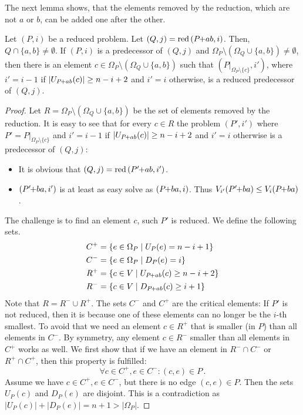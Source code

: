 \documentclass[twoside,leqno,twocolumn]{article}
\newcommand{\pchild}[3]{{#1}\kern-1pt{+}{#2}{#3}}
\newcommand{\reduced}[1]{\operatorname{red}{#1}}
\newcommand{\less}[2]{D_{#1}(#2)}
\newcommand{\greater}[2]{U_{#1}(#2)}
\begin{document}
The next lemma shows, that the elements removed by the reduction, which are not $a$ or $b$, can be added one after the other.

\begin{lemma}\label{lemma:remove_elements_iteratively}
  Let $(P, i)$ be a reduced problem.
  Let $(Q, j) = \reduced{(\pchild{P}{a}{b}, i)}$.
  Then, $Q \cap \{a, b\} \neq \emptyset$.
  If $(P, i)$ is a predecessor of $(Q, j)$ and $\Omega_P \setminus (\Omega_Q \cup \{a, b\}) \neq \emptyset$, then there is an element $c \in \Omega_P \setminus (\Omega_Q \cup \{a, b\})$ such that $(P|_{\Omega_P \setminus \{c\}}, i')$, where $i' = i - 1$ if $|\greater{\pchild{P}{a}{b}}{c}| \ge n-i+2$ and $i'=i$ otherwise, is a reduced predecessor of $(Q, j)$.
\end{lemma}

\begin{proof}
  Let $R = \Omega_P \setminus (\Omega_Q \cup \{a, b\})$ be the set of elements removed by the reduction.
  It is easy to see that for every $c \in R$ the problem $(P', i')$ where $P' = P|_{\Omega_P \setminus \{c\}}$ and $i' = i - 1$ if $|\greater{\pchild{P}{a}{b}}{c}| \ge n-i+2$ and $i'=i$ otherwise is a predecessor of $(Q, j)$:
  \begin{itemize}
    \item It is obvious that $(Q, j) = \reduced{(\pchild{P'}{a}{b}, i')}$.
    \item $(\pchild{P'}{b}{a}, i')$ is at least as easy solve as $(\pchild{P}{b}{a}, i)$. Thus $V_{i'}(\pchild{P'}{b}{a}) \le V_i(\pchild{P}{b}{a})$.
  \end{itemize}
  The challenge is to find an element $c$, such $P'$ is reduced.
  We define the following sets.
  \begin{align*}
    C^+ & = \{e \in \Omega_P \mid \greater{P}{e} = n - i + 1\}            \\
    C^- & = \{e \in \Omega_P \mid \less{P}{e} = i \}                      \\
    R^+ & = \{c \in V \mid \greater{\pchild{P}{a}{b}}{c} \ge n - i + 2 \} \\
    R^- & = \{c \in V \mid \less{\pchild{P}{a}{b}}{c} \ge i + 1 \}
  \end{align*}
  Note that $R = R^- \cup R^+$.
  The sets $C^-$ and $C^+$ are the critical elements:
  If $P'$ is not reduced, then it is because one of these elements can no longer be the $i$-th smallest.
  To avoid that we need an element $c \in R^+$ that is smaller (in $P$) than all elements in $C^-$.
  By symmetry, any element $c \in R^-$ smaller than all elements in $C^+$ works as well.
  We first show that if we have an element in $R^- \cap C^-$ or $R^+ \cap C^+$, then this property is fulfilled:
  \begin{equation}
    \forall c \in C^+, e \in C^- \colon (c, e) \in P\,\text{.}
  \end{equation}
  Assume we have $c \in C^+, e \in C^-$, but there is no edge $(c, e) \in P$.
  Then the sets $\greater{P}{c}$ and $\less{P}{e}$ are disjoint.
  This is a contradiction as $|\greater{P}{c}| + |\less{P}{e}| = n + 1 > |\Omega_P|$.


\end{proof}
\end{document}
